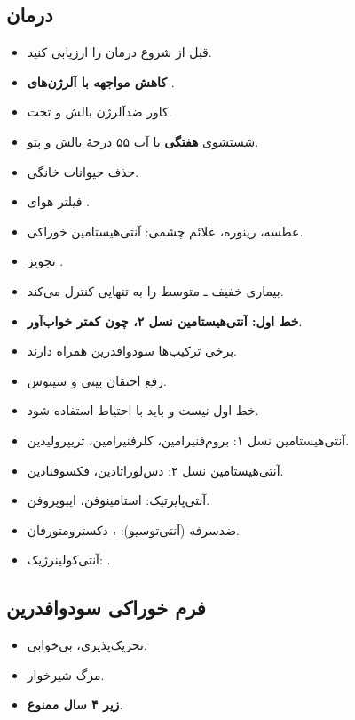 \documentclass[12pt,a4paper]{article}
\begin{document}
\subsection*{درمان }
\begin{itemize}
\item قبل از شروع درمان  را ارزیابی کنید.
\item \textbf{کاهش مواجهه با آلرژن‌های }.
\item کاور ضدآلرژن بالش و تخت.
\item شستشوی \textbf{هفتگی} با آب ۵۵ درجهٔ بالش و پتو.
\item حذف حیوانات خانگی.
\item فیلتر هوای .
\item عطسه، رینوره، علائم چشمی: آنتی‌هیستامین خوراکی.
\item تجویز .
\item بیماری خفیف ـ متوسط را به تنهایی کنترل می‌کند.
\end{itemize}

\begin{itemize}
\item \textbf{خط اول: آنتی‌هیستامین نسل ۲، چون کمتر خواب‌آور}.
\item برخی ترکیب‌ها سودوافدرین همراه دارند.
\item رفع احتقان بینی و سینوس.
\item خط اول نیست و باید با احتیاط استفاده شود.
\end{itemize}
\begin{itemize}
\item آنتی‌هیستامین نسل ۱: بروم‌فنیرامین، کلرفنیرامین، تریپرولیدین.
\item آنتی‌هیستامین نسل ۲: دس‌لوراتادین، فکسوفنادین.
\item آنتی‌پایرتیک: استامینوفن، ایبوپروفن.
\item ضدسرفه (آنتی‌توسیو): ، دکسترومتورفان.
\item آنتی‌کولینرژیک: .
\end{itemize}
\subsection*{فرم خوراکی سودوافدرین}
\begin{itemize}
\item تحریک‌پذیری، بی‌خوابی.
\item مرگ شیرخوار.
\item \textbf{زیر ۴ سال ممنوع}.
\end{itemize}
\end{document}
